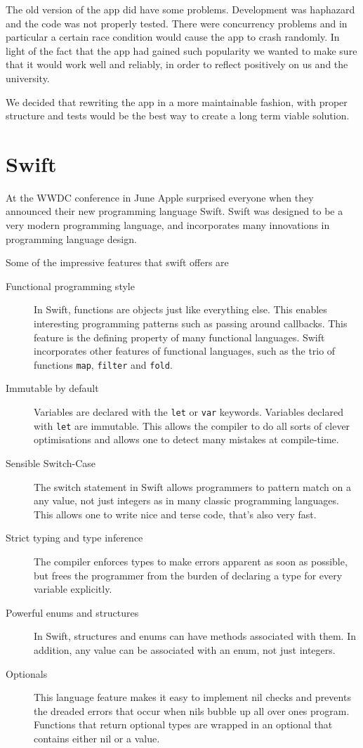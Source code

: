 \documentclass[pdftex, DIV=calc, paper=a4, fontsize=11pt, twocolumn]{scrartcl}	 %
\begin{document}
The old version of the app did have some problems. Development was haphazard and the code was not
properly tested. There were concurrency problems and in particular a certain race condition would
cause the app to crash randomly. In light of the fact that the app had gained such popularity we 
wanted to make sure that it would work well and reliably, in order to reflect positively on us and
the university.

We decided that rewriting the app in a more maintainable fashion, with proper structure and tests
would be the best way to create a long term viable solution.


\section*{Swift}

At the WWDC conference in June Apple surprised everyone when they announced their new programming
language Swift. Swift was designed to be a very modern programming language, and incorporates
many innovations in programming language design.

Some of the impressive features that swift offers are
\begin{description}
    \item[Functional programming style] In Swift, functions are objects just like everything else.
        This enables interesting programming patterns such as passing around callbacks. This feature
        is the defining property of many functional languages. Swift incorporates other features 
        of functional languages, such as the trio of functions \texttt{map}, \texttt{filter} and \texttt{fold}.
    \item[Immutable by default] Variables are declared with the \texttt{let} or \texttt{var}
        keywords. Variables declared with \texttt{let} are immutable. This allows the compiler to
        do all sorts of clever optimisations and allows one to detect many mistakes at compile-time.
    \item[Sensible Switch-Case] The switch statement in Swift allows programmers to pattern match on
        a any value, not just integers as in many classic programming languages. This allows one 
        to write nice and terse code, that's also very fast.
    \item[Strict typing and type inference] The compiler enforces types to make errors apparent as
        soon as possible, but frees the programmer from the burden of declaring a type for every
        variable explicitly.
    \item[Powerful enums and structures] In Swift, structures and enums can have methods associated with them. In addition, any value can be associated with an enum, not just integers.
    \item[Optionals] This language feature makes it easy to implement nil checks and prevents the 
        dreaded errors that occur when nils bubble up all over ones program. Functions that return 
        optional types are wrapped in an optional that contains either nil or a value. 
\end{description}
\end{document}

